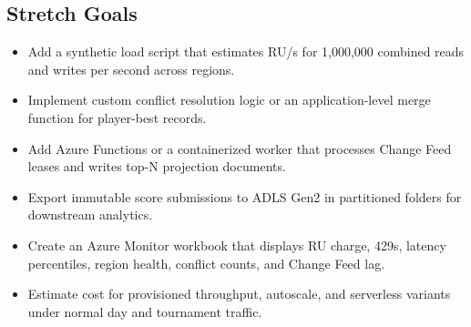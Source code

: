 \subsection*{Stretch Goals}
\begin{itemize}
    \item Add a synthetic load script that estimates RU/s for 1,000,000 combined reads and writes per second across regions.
    \item Implement custom conflict resolution logic or an application-level merge function for player-best records.
    \item Add Azure Functions or a containerized worker that processes Change Feed leases and writes top-N projection documents.
    \item Export immutable score submissions to ADLS Gen2 in partitioned folders for downstream analytics.
    \item Create an Azure Monitor workbook that displays RU charge, 429s, latency percentiles, region health, conflict counts, and Change Feed lag.
    \item Estimate cost for provisioned throughput, autoscale, and serverless variants under normal day and tournament traffic.
\end{itemize}
